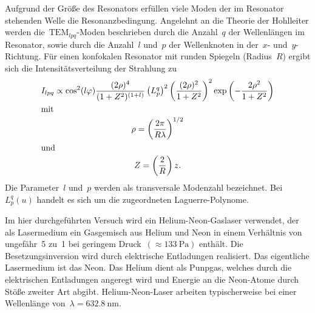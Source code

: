 Aufgrund der Größe des Resonators erfüllen viele Moden der im Resonator
stehenden Welle die Resonanzbedingung. Angelehnt an die Theorie der Hohlleiter
werden die~$\text{TEM}_{lpq}$-Moden beschrieben durch die Anzahl~$q$ der
Wellenlängen im Resonator, sowie durch die Anzahl~$l$ und~$p$ der Wellenknoten
in der~$x$- und~$y$-Richtung. Für einen konfokalen Resonator mit runden Spiegeln
(Radius~$R$) ergibt sich die Intensitätsverteilung der Strahlung zu
%
\begin{gather}
  I_{lpq}\propto\cos^2(l\varphi)\frac{(2\rho)^4}{(1+Z^2)^{(1+l)}}\left(L_p^q\right)^2\left(\frac{(2\rho)^2}{1+Z^2}\right)^2\exp\left(-\frac{2\rho^2}{1+Z^2}\right) \\
  \shortintertext{mit}
  \rho=\left(\frac{2\pi}{R\lambda}\right)^{1/2} \\
  \shortintertext{und}
  Z=\left(\frac{2}{R}\right)z.
\end{gather}
%
Die Parameter~$l$ und~$p$ werden als transversale Modenzahl bezeichnet.
Bei~$L_p^q(u)$ handelt es sich um die zugeordneten Laguerre-Polynome.

Im hier durchgeführten Versuch wird ein Helium-Neon-Gaslaser verwendet, der als
Lasermedium ein Gasgemisch aus Helium und Neon in einem Verhältnis von
ungefähr~\num{5} zu~\num{1} bei geringem Druck~$(\approx\SI{133}{\pascal})$
enthält. Die Besetzungsinversion wird durch elektrische Entladungen realisiert.
Das eigentliche Lasermedium ist das Neon. Das Helium dient als Punpgas, welches
durch die elektrischen Entladungen angeregt wird und Energie an die Neon-Atome
durch Stöße zweiter Art abgibt. Helium-Neon-Laser arbeiten typischerweise bei
einer Wellenlänge von~$\lambda=\SI{632.8}{\nano\metre}$.
